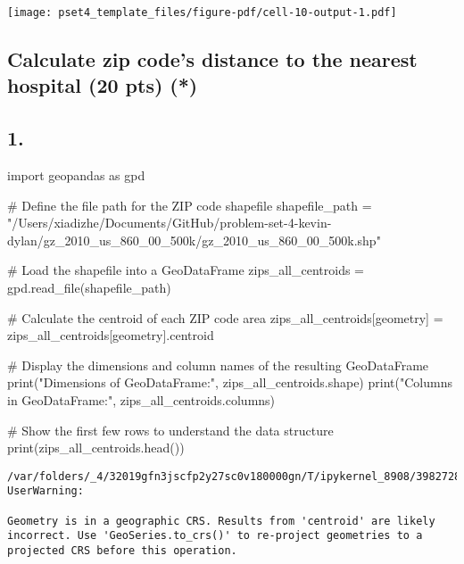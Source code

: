 \documentclass[
  letterpaper,
  DIV=11,
  numbers=noendperiod]{scrartcl}
\newenvironment{Shaded}{\begin{snugshade}}{\end{snugshade}}
\newcommand{\BuiltInTok}[1]{\textcolor[rgb]{0.00,0.23,0.31}{#1}}
\newcommand{\CommentTok}[1]{\textcolor[rgb]{0.37,0.37,0.37}{#1}}
\newcommand{\ImportTok}[1]{\textcolor[rgb]{0.00,0.46,0.62}{#1}}
\newcommand{\NormalTok}[1]{\textcolor[rgb]{0.00,0.23,0.31}{#1}}
\newcommand{\OperatorTok}[1]{\textcolor[rgb]{0.37,0.37,0.37}{#1}}
\newcommand{\StringTok}[1]{\textcolor[rgb]{0.13,0.47,0.30}{#1}}
\begin{document}
\texttt{[image: pset4\_template\_files/figure-pdf/cell-10-output-1.pdf]}

\subsection{Calculate zip code's distance to the nearest hospital (20
pts)
(*)}\label{calculate-zip-codes-distance-to-the-nearest-hospital-20-pts}

\subsection{1.}\label{section-3}

\begin{Shaded}
\begin{Highlighting}[]
\ImportTok{import}\NormalTok{ geopandas }\ImportTok{as}\NormalTok{ gpd}

\CommentTok{\# Define the file path for the ZIP code shapefile}
\NormalTok{shapefile\_path }\OperatorTok{=} \StringTok{"/Users/xiadizhe/Documents/GitHub/problem{-}set{-}4{-}kevin{-}dylan/gz\_2010\_us\_860\_00\_500k/gz\_2010\_us\_860\_00\_500k.shp"}

\CommentTok{\# Load the shapefile into a GeoDataFrame}
\NormalTok{zips\_all\_centroids }\OperatorTok{=}\NormalTok{ gpd.read\_file(shapefile\_path)}

\CommentTok{\# Calculate the centroid of each ZIP code area}
\NormalTok{zips\_all\_centroids[}\StringTok{\textquotesingle{}geometry\textquotesingle{}}\NormalTok{] }\OperatorTok{=}\NormalTok{ zips\_all\_centroids[}\StringTok{\textquotesingle{}geometry\textquotesingle{}}\NormalTok{].centroid}

\CommentTok{\# Display the dimensions and column names of the resulting GeoDataFrame}
\BuiltInTok{print}\NormalTok{(}\StringTok{"Dimensions of GeoDataFrame:"}\NormalTok{, zips\_all\_centroids.shape)}
\BuiltInTok{print}\NormalTok{(}\StringTok{"Columns in GeoDataFrame:"}\NormalTok{, zips\_all\_centroids.columns)}

\CommentTok{\# Show the first few rows to understand the data structure}
\BuiltInTok{print}\NormalTok{(zips\_all\_centroids.head())}
\end{Highlighting}
\end{Shaded}

\begin{verbatim}
/var/folders/_4/32019gfn3jscfp2y27sc0v180000gn/T/ipykernel_8908/3982728313.py:10: UserWarning:

Geometry is in a geographic CRS. Results from 'centroid' are likely incorrect. Use 'GeoSeries.to_crs()' to re-project geometries to a projected CRS before this operation.

\end{verbatim}
\end{document}
